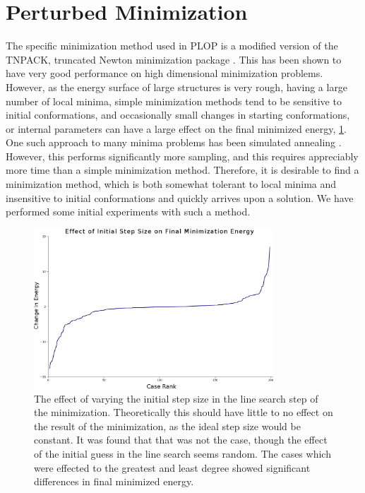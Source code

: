 \section{Perturbed Minimization}
\label{section:unsorted/perturbed_minimization}

The specific minimization method used in PLOP is a modified version of the TNPACK, truncated Newton minimization package \cite{schlick1992tnpack,schlick1992tnpack2}.
This has been shown to have very good performance on high dimensional minimization problems.
However, as the energy surface of large structures is very rough, having a large number of local minima, simple minimization methods tend to be sensitive to initial conformations, and occasionally small changes in starting conformations, or internal parameters can have a large effect on the final minimized energy, \ref{figure:sensitive_initial_conditions}.
One such approach to many minima problems has been simulated annealing \cite{kirkpatrick1983optimization,vcerny1985thermodynamical}.
However, this performs significantly more sampling, and this requires appreciably more time than a simple minimization method.
Therefore, it is desirable to find a minimization method, which is both somewhat tolerant to local minima and insensitive to initial conformations and quickly arrives upon a solution.
We have performed some initial experiments with such a method.
\begin{figure}
\centering
\includegraphics[width=0.8\textwidth,height=0.8\textheight,keepaspectratio]{figures/effect_of_lambda_on_min2.png}
\caption{The effect of varying the initial step size in the line search step of the minimization.
Theoretically this should have little to no effect on the result of the minimization, as the ideal step size would be constant.
It was found that that was not the case, though the effect of the initial guess in the line search seems random.
The cases which were effected to the greatest and least degree showed significant differences in final minimized energy.}
\label{figure:sensitive_initial_conditions}
\end{figure}


